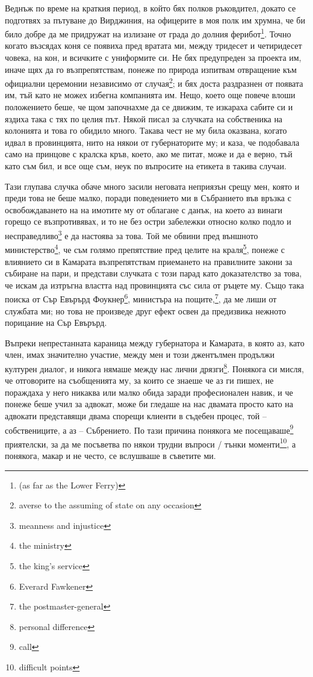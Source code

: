 \documentclass[12pt]{book}
\begin{document}
Веднъж по време на краткия период, в който бях полков ръковдител, докато се подготвях за пътуване до Вирджиния, на офицерите в моя полк им хрумна, че би било добре да ме придружат на излизане от града до долния ферибот\footnote{(as far as the Lower Ferry)}. Точно когато възсядах коня се появиха пред вратата ми, между тридесет и четиридесет човека, на кон, и всичките с униформите си. Не бях предупреден за проекта им, иначе щях да го възпрепятствам, понеже по природа изпитвам отвращение към официални церемонии независимо от случая\footnote{averse to the assuming of state on any occasion}; и бях доста раздразнен от появата им, тъй като не можех избегна компанията им. Нещо, което още повече влоши положението беше, че щом започнахме да се движим, те изкараха сабите си и яздиха така с тях по целия път. Някой писал за случката на собственика на колонията и това го обидило много. Такава чест не му била оказвана, когато идвал в провинцията, нито на някои от губернаторите му; и каза, че подобавала само на принцове с кралска кръв, което, ако ме питат, може и да е верно, тъй като съм бил, и все още съм, неук по въпросите на етикета в такива случаи. 

Тази глупава случка обаче много засили неговата неприязън срещу мен, която и преди това не беше малко, поради поведението ми в Събранието във връзка с освобождаването на на имотите му от облагане с данък, на което аз винаги горещо се възпротивявах, и то не без остри забележки относно колко подло и несправедливо\footnote{meanness and injustice} е да настоява за това. Той ме обвини пред външното министерство\footnote{the ministry}, че съм голямо препятствие пред целите на краля\footnote{the king's service}, понеже с влиянието си в Камарата възпрепятствам приемането на правилните закони за събиране на пари, и представи случката с този парад като доказателство за това, че искам да изтръгна властта над провинцията със сила от ръцете му. Също така поиска от Сър Евърърд Фоукнер\footnote{Everard Fawkener}, министъра на пощите,\footnote{the postmaster-general}, да ме лиши от службата ми; но това не произведе друг ефект освен да предизвика нежното порицание на Сър Евърърд. 

Въпреки непрестанната караница между губернатора и Камарата, в която аз, като член, имах значително участие, между мен и този джентълмен продължи културен диалог, и никога нямаше между нас лични дрязги\footnote{personal difference}. Понякога си мисля, че отговорите на съобщенията му, за които се знаеше че аз ги пишех, не пораждаха у него никаква или малко обида заради професионален навик, и че понеже беше учил за адвокат, може би гледаше на нас двамата просто като на адвокати представящи двама спорещи клиенти в съдебен процес, той – собствениците, а аз – Събрението. По тази причина понякога ме посещаваше\footnote{call} приятелски, за да ме посъветва по някои трудни въпроси / тънки моменти\footnote{difficult points}, а понякога, макар и не често, се вслушваше в съветите ми.
\end{document}
